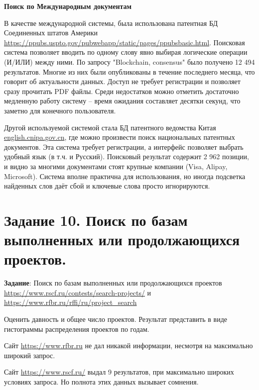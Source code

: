 \documentclass[a4paper, 12pt]{report}		%
\begin{document}
\textbf{Поиск по Международным документам}


В качестве международной системы, была использована патентная БД Соединенных штатов Америки \url{https://ppubs.uspto.gov/pubwebapp/static/pages/ppubsbasic.html}. Поисковая система позволяет вводить по одному слову явно выбирая логические операции (И/ИЛИ) между ними. По запросу "Blockchain, consensus" было получено 12 494 результатов. Многие из них были опубликованы в течение последнего месяца, что говорит об актуальности данных. Доступ не требует регистрации и позволяет сразу прочитать PDF файлы. Среди недостатков можно отметить достаточно медленную работу систему -- время ожидания составляет десятки секунд, что заметно для конечного пользователя.

Другой используемой системой стала БД патентного ведомства Китая \url{english.cnipa.gov.cn}, где можно произвести поиск национальных патентных документов. Эта система требует регистрации, а интерфейс позволяет выбрать удобный язык (в т.ч. и Русский). Поисковый результат содержит 2 962 позиции, и видно за многими документами стоят крупные компании (Visa, Alipay, Microsoft). Система вполне практична для использования, но иногда подсветка найденных слов даёт сбой и ключевые слова просто игнорируются.




\chapter*{Задание 10. Поиск по базам выполненных или продолжающихся проектов.}


\textbf{Задание}: Поиск по базам выполненных или продолжающихся проектов \url{https://www.rscf.ru/contests/search-projects/} и \url{https://www.rfbr.ru/rffi/ru/project_search}


Оценить давность и общее число проектов. Результат представить в виде гистограммы распределения проектов по годам.


Сайт \url{https://www.rfbr.ru} не дал никакой информации, несмотря на максимально широкий запрос.


Сайт \url{https://www.rscf.ru/} выдал 9 результатов, при максимально широких условиях запроса. Но полнота этих данных вызывает сомнения.


\begin{center}
\end{center}
\end{document}
